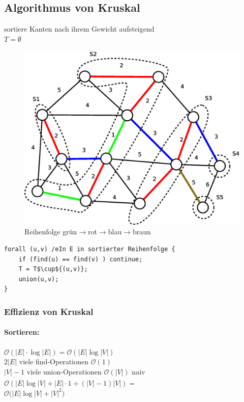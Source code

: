 \subsection{Algorithmus von Kruskal}
sortiere Kanten nach ihrem Gewicht aufsteigend\\
$T=\emptyset$\\

\begin{figure}
	\centering
	\includegraphics[width=\linewidth]{19/Grafik/SpannbaumBeispiel3}
	\caption{Reihenfolge grün$\rightarrow$rot$\rightarrow$blau$\rightarrow$braun}
	\label{fig:Beispiel3}
	\vspace{-500pt}
\end{figure}
\begin{lstlisting}
forall (u,v) /eIn E in sortierter Reihenfolge {
	if (find(u) == find(v) ) continue;
	T = T$\cup${(u,v)};
	union(u,v);
}
\end{lstlisting}
\subsubsection{Effizienz von Kruskal}
\paragraph{Sortieren:} $\mathcal{O}(|E|\cdot\log|E|) = \mathcal{O}(|E|\log|V|)$\\
$2|E|$ viele find-Operationen $\mathcal{O}(1)$\\
$\underline{|V|-1}$ viele union-Operationen $\mathcal{O}(|V|)$ naiv\\
$\mathcal{O}(|E|\log|V|+|E|\cdot 1 + (|V|-1)|V|) =$\\ $\mathcal{O}(|E|\log|V|+$\sout{$|V|^2$}$)$\\
